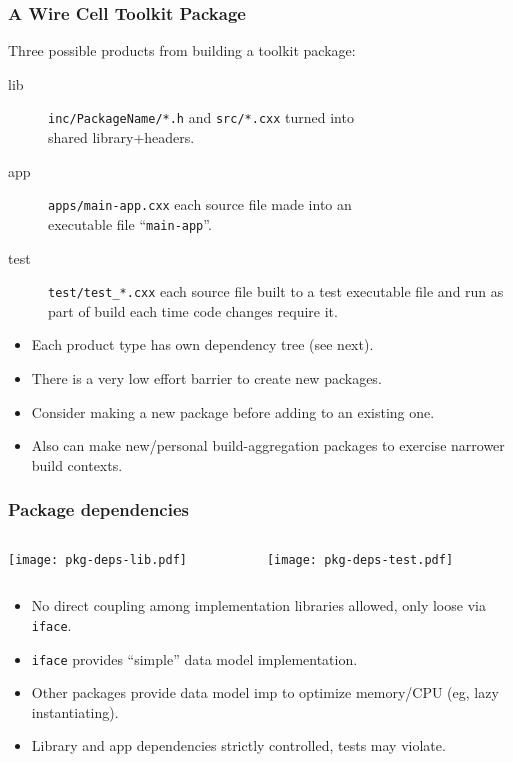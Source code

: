 \documentclass[xcolor=dvipsnames]{beamer}
\begin{document}
\begin{frame}
  \frametitle{A Wire Cell Toolkit Package}

  Three possible products from building a toolkit package:

  \footnotesize

  \begin{description}
  \item[lib] \texttt{inc/PackageName/*.h} and \texttt{src/*.cxx}
    turned into \\
    shared library+headers.
  \item[app] \texttt{apps/main-app.cxx} each source file made into an \\
    executable file ``\texttt{main-app}''.
  \item[test] \texttt{test/test\_*.cxx} each source file built to a
    test executable file and run as part of build each time code changes require it.
  \end{description}

  \begin{itemize}
  \item Each product type has own dependency tree (see next).

  \item There is a very low effort barrier to create new packages.

  \item Consider making a new package before adding to an existing one.

  \item Also can make new/personal build-aggregation packages to
    exercise narrower build contexts.

  \end{itemize}
\end{frame}

\begin{frame}[fragile]
  \frametitle{Package dependencies}
  \begin{columns}
    \begin{column}{0.4\paperwidth}
      \texttt{[image: pkg-deps-lib.pdf]}
    \end{column}
    \begin{column}{0.2\paperwidth}
      \texttt{[image: pkg-deps-test.pdf]}
    \end{column}
  \end{columns}

  \footnotesize
  \begin{itemize}
  \item No direct coupling among implementation libraries allowed, only loose via \texttt{iface}.
  \item \texttt{iface} provides ``simple'' data model implementation.
  \item Other packages provide data model imp to optimize memory/CPU (eg, lazy instantiating).
  \item Library and app dependencies strictly controlled, tests may violate.
  \end{itemize}
\end{frame}
\end{document}
